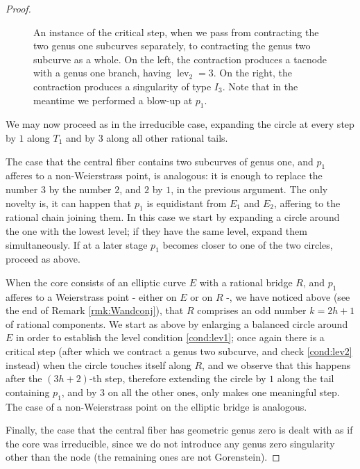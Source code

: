 \documentclass[11pt]{amsart}
\newcommand{\lev}{\operatorname{lev}}
\theoremstyle{plain}
\theoremstyle{definition}
\begin{document}
\begin{proof}
\begin{itemize}[leftmargin=.4cm]
\begin{figure}
   \caption{An instance of the critical step, when we pass from contracting the two genus one subcurves separately, to contracting the genus two subcurve as a whole. On the left, the contraction produces a tacnode with a genus one branch, having $\lev_2=3$. On the right, the contraction produces a singularity of type $I_3$. Note that in the meantime we performed a blow-up at $p_1$.}\label{fig:critical}
  \end{figure}
 We may now proceed as in the irreducible case, expanding the circle at every step by $1$ along $T_1$ and by $3$ along all other rational tails.
 \end{itemize}
 The case that the central fiber contains two subcurves of genus one, and $p_1$ afferes to a non-Weierstrass point, is analogous: it is enough to replace the number $3$ by the number $2$, and $2$ by $1$, in the previous argument. The only novelty is, it can happen that $p_1$ is equidistant from $E_1$ and $E_2$, affering to the rational chain joining them. In this case we start by expanding a circle around the one with the lowest level; if they have the same level, expand them simultaneously. If at a later stage $p_1$ becomes closer to one of the two circles, proceed as above.
 
 \smallskip
 
 When the core consists of an elliptic curve $E$ with a rational bridge $R$, and $p_1$ afferes to a Weierstrass point - either on $E$ or on $R$ -, we have noticed above (see the end of Remark \ref{rmk:Wandconj}), that $R$ comprises an odd number $k=2h+1$ of rational components. We start as above by enlarging a balanced circle around $E$ in order to establish the level condition \eqref{cond:lev1}; once again there is a critical step (after which we contract a genus two subcurve, and check \eqref{cond:lev2} instead) when the circle touches itself along $R$, and we observe that this happens after the $(3h+2)$-th step, therefore extending the circle by $1$ along the tail containing $p_1$, and by $3$ on all the other ones, only makes one meaningful step. The case of a non-Weierstrass point on the elliptic bridge is analogous.
 
 \smallskip
 
 Finally, the case that the central fiber has geometric genus zero is dealt with as if the core was irreducible, since we do not introduce any genus zero singularity other than the node (the remaining ones are not Gorenstein).

\end{proof}
\end{document}

